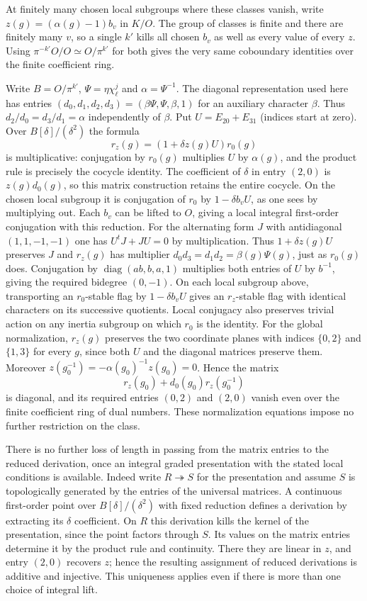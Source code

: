 \documentclass[11pt]{amsart}
\theoremstyle{definition}
\theoremstyle{remark}
\begin{document}
At finitely many chosen local subgroups where these
classes vanish, write $z(g)=(\alpha(g)-1)b_v$ in $K/O$.
The group of classes is finite and there are finitely many $v$,
so a single $k'$ kills all chosen $b_v$ as well as every value of
every $z$. Using $\pi^{-k'}O/O\simeq O/\pi^{k'}$ for both gives
the very same coboundary identities over the finite coefficient ring.

Write $B=O/\pi^{k'}$, $\Psi=\eta\chi_\ell^j$ and
$\alpha=\Psi^{-1}$. The diagonal representation used here has entries
$(d_0,d_1,d_2,d_3)=(\beta\Psi,\Psi,\beta,1)$ for an auxiliary
character $\beta$. Thus $d_2/d_0=d_3/d_1=\alpha$ independently
of $\beta$. Put $U=E_{20}+E_{31}$ (indices start
at zero). Over $B[\delta]/(\delta^2)$ the formula
\[
 r_z(g)=(1+\delta z(g)U)r_0(g)
\]
is multiplicative: conjugation by $r_0(g)$ multiplies $U$ by
$\alpha(g)$, and the product rule is precisely the cocycle identity.
The coefficient of $\delta$ in entry $(2,0)$ is $z(g)d_0(g)$,
so this matrix construction retains the entire cocycle. On the
chosen local subgroup it is conjugation of $r_0$ by
$1-\delta b_v U$, as one sees by multiplying out. Each $b_v$
can be lifted to $O$, giving a local integral first-order conjugation
with this reduction. For the alternating form $J$ with antidiagonal
$(1,1,-1,-1)$ one has $U^tJ+JU=0$ by multiplication. Thus
$1+\delta z(g)U$ preserves $J$ and $r_z(g)$ has multiplier
$d_0d_3=d_1d_2=\beta(g)\Psi(g)$, just as $r_0(g)$ does.
Conjugation by $\operatorname{diag}(ab,b,a,1)$ multiplies both
entries of $U$ by $b^{-1}$, giving the required bidegree $(0,-1)$.
On each local subgroup above, transporting an $r_0$-stable flag
by $1-\delta b_v U$ gives an $r_z$-stable flag with identical
characters on its successive quotients. Local conjugacy also preserves trivial action on
any inertia subgroup on which $r_0$ is the identity. For the global
normalization, $r_z(g)$ preserves the two coordinate planes with
indices $\{0,2\}$ and $\{1,3\}$ for every $g$, since both $U$
and the diagonal matrices preserve them. Moreover
$z(g_0^{-1})=-\alpha(g_0)^{-1}z(g_0)=0$. Hence the matrix
\[
 r_z(g_0)+d_0(g_0)r_z(g_0^{-1})
\]
is diagonal, and its required entries $(0,2)$ and $(2,0)$ vanish
even over the finite coefficient ring of dual numbers. These
normalization equations impose no further restriction on the class.

There is no further loss of length in passing from the matrix
entries to the reduced derivation, once an integral graded
presentation with the stated local conditions is available. Indeed
write $R\twoheadrightarrow S$ for the presentation and assume $S$
is topologically generated by the entries of the universal matrices.
A continuous first-order point over $B[\delta]/(\delta^2)$ with
fixed reduction defines a derivation by extracting its $\delta$
coefficient. On $R$ this derivation kills the kernel of the
presentation, since the point factors through $S$. Its values on
the matrix entries determine it by the product rule and continuity.
There they are linear in $z$, and entry $(2,0)$ recovers $z$;
hence the resulting assignment of reduced derivations is additive
and injective. This uniqueness applies even if there is more than
one choice of integral lift.
\end{document}
